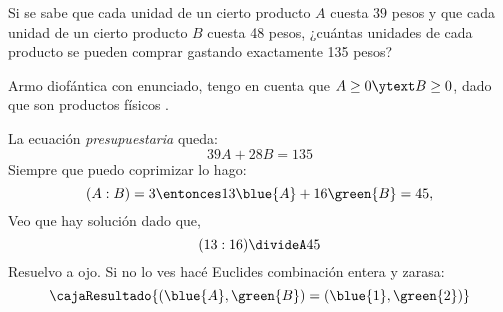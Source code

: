 \begin{enunciado}{\ejercicio}
  Si se sabe que cada unidad de un cierto producto $A$ cuesta $39$ pesos y que cada unidad de un cierto
  producto $B$ cuesta 48 pesos, ¿cuántas unidades de cada producto se pueden comprar gastando exactamente
  135 pesos?
\end{enunciado}

Armo diofántica con enunciado, tengo en cuenta que
$A \geq 0 \ytext B \geq 0$, dado que son productos físicos {}.

La ecuación \textit{presupuestaria} queda:
$$
  39A + 28B = 135
$$
Siempre que puedo coprimizar lo hago:
$$
  (A:B) = 3
  \entonces
  13 \blue{A} + 16\green{B} = 45,
$$
Veo que hay solución dado que,
$$
  (13:16) \divideA 45
$$
Resuelvo a ojo. Si no lo ves hacé Euclides combinación entera y zarasa:
$$
  \cajaResultado{
    (\blue{A},\green{B}) = (\blue{1},\green{2})
  }
$$

\begin{aportes}
  \item {}
\end{aportes}
